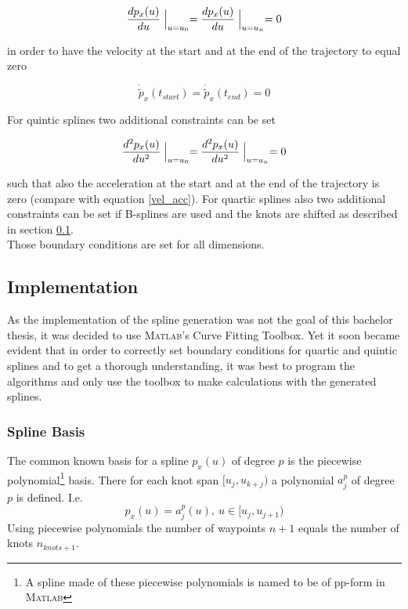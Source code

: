 \begin{equation*}
\frac{dp_x(u)}{du} \Bigm|_{u=u_0} = \frac{dp_x(u)}{du} \Bigm|_{u=u_n}=0
\end{equation*}

in order to have the velocity at the start and at the end of the trajectory to equal zero

\begin{equation*}
\dot{\tilde{p}}_x(t_{start}) = \dot{\tilde{p}}_x(t_{end})=0
\end{equation*}

For quintic splines two additional constraints can be set

\begin{equation*}
\frac{d^2p_x(u)}{du^2} \Bigm|_{u=u_0} = \frac{d^2p_x(u)}{du^2} \Bigm|_{u=u_n}=0
\end{equation*}

such that also the acceleration at the start and at the end of the trajectory is zero (compare with equation \eqref{vel_acc}). For quartic splines also two additional constraints can be set if B-splines are used and the knots are shifted as described in section \ref{subsec:implementation}. \\
Those boundary conditions are set for all dimensions.



\subsection{Implementation}
\label{subsec:implementation}
As the implementation of the spline generation was not the goal of this bachelor thesis, it was decided to use \textsc{Matlab}'s Curve Fitting Toolbox. Yet it soon became evident that in order to correctly set boundary conditions for quartic and quintic splines and to get a thorough understanding, it was best to program the algorithms and only use the toolbox to make calculations with the generated splines.\\

\subsubsection{Spline Basis}
The common known basis for a spline $p_x(u)$ of degree $p$ is the piecewise polynomial\footnote{A spline made of these piecewise polynomials is named to be of pp-form in \textsc{Matlab}} basis. There for each knot span $[u_j, u_{k+j})$ a polynomial $a_j^p$ of degree $p$ is defined. I.e. 
\begin{equation}
p_x(u)=a_j^p(u),~u \in [u_j,u_{j+1})
\end{equation}
Using piecewise polynomials the number of waypoints $n+1$ equals the number of knots $n_{knots+1}$.


